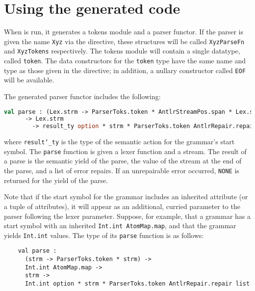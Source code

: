
\section{Using the generated code}\label{sec:antlr-gencode}

When \antlr{} is run, it generates a tokens module and a parser functor.
If the parser is given the name \texttt{Xyz} via the  directive, these structures will be called \texttt{XyzParseFn} and \texttt{XyzTokens} respectively.  
The tokens module will contain a single datatype, called \texttt{token}.  The data constructors for the \texttt{token} type have the same name and type as those given in the  directive; in addition, a nullary constructor called \texttt{EOF} will be available.

The generated parser functor includes the following:
\begin{lstlisting}[language=SML]
val parse : (Lex.strm -> ParserToks.token * AntlrStreamPos.span * Lex.strm)
      -> Lex.strm
        -> result_ty option * strm * ParserToks.token AntlrRepair.repair list
\end{lstlisting}%
where \texttt{result\char`\_ty} is the type of the semantic action for the grammar's start symbol.  
The \texttt{parse} function is given a lexer function and a stream.
The result of a parse is the semantic yield of the parse, the value of the stream at the end of the parse, and a list of error repairs.  
If an unrepairable error occurred, \texttt{NONE} is returned for the yield of the parse.

Note that if the start symbol for the grammar includes an inherited attribute (or a tuple of attributes), it will appear as an additional, curried parameter to the parser following the lexer parameter.  Suppose, for example, that a grammar has a start symbol with an inherited \texttt{Int.int AtomMap.map}, and that the grammar yields \texttt{Int.int} values.  The type of its \texttt{parse} function is as follows:
\begin{lstlisting}
    val parse : 
      (strm -> ParserToks.token * strm) -> 
      Int.int AtomMap.map -> 
      strm -> 
      Int.int option * strm * ParserToks.token AntlrRepair.repair list
\end{lstlisting}

